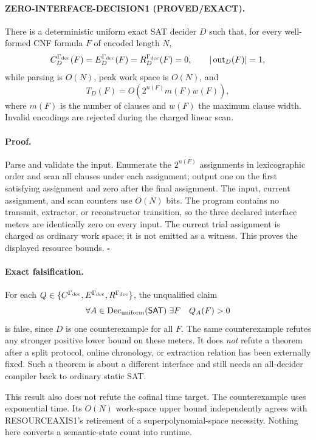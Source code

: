 \documentclass[11pt]{article}
\newcommand{\SAT}{\mathsf{SAT}}
\begin{document}
\paragraph{ZERO-INTERFACE-DECISION1 (PROVED/EXACT).}
There is a deterministic uniform exact SAT decider \(D\) such that, for every
well-formed CNF formula \(F\) of encoded length \(N\),
\[
 C_D^{\Gamma_{\rm dec}}(F)=E_D^{\Gamma_{\rm dec}}(F)
 =R_D^{\Gamma_{\rm dec}}(F)=0,
 \qquad |\operatorname{out}_D(F)|=1,
\]
while parsing is \(O(N)\), peak work space is \(O(N)\), and
\[
 T_D(F)=O(2^{n(F)}m(F)w(F)),
\]
where \(m(F)\) is the number of clauses and \(w(F)\) the maximum clause
width.  Invalid encodings are rejected during the charged linear scan.

\paragraph{Proof.}
Parse and validate the input.  Enumerate the \(2^{n(F)}\) assignments in
lexicographic order and scan all clauses under each assignment; output one on
the first satisfying assignment and zero after the final assignment.  The
input, current assignment, and scan counters use \(O(N)\) bits.  The program
contains no transmit, extractor, or reconstructor transition, so the three
declared interface meters are identically zero on every input.  The current
trial assignment is charged as ordinary work space; it is not emitted as a
witness.  This proves the displayed resource bounds. \(\square\)

\paragraph{Exact falsification.}
For each \(Q\in\{C^{\Gamma_{\rm dec}},E^{\Gamma_{\rm dec}},
R^{\Gamma_{\rm dec}}\}\), the unqualified claim
\[
  \forall A\in\operatorname{Dec}_{\rm uniform}(\SAT)\;
  \exists F\quad Q_A(F)>0
\]
is false, since \(D\) is one counterexample for all \(F\).  The same
counterexample refutes any stronger positive lower bound on these meters.
It does \emph{not} refute a theorem after a split protocol, online chronology,
or extraction relation has been externally fixed.  Such a theorem is about a
different interface and still needs an all-decider compiler back to ordinary
static SAT.

This result also does not refute the cofinal time target.  The counterexample
uses exponential time.  Its \(O(N)\) work-space upper bound independently
agrees with RESOURCEAXIS1's retirement of a superpolynomial-space necessity.
Nothing here converts a semantic-state count into runtime.
\end{document}
